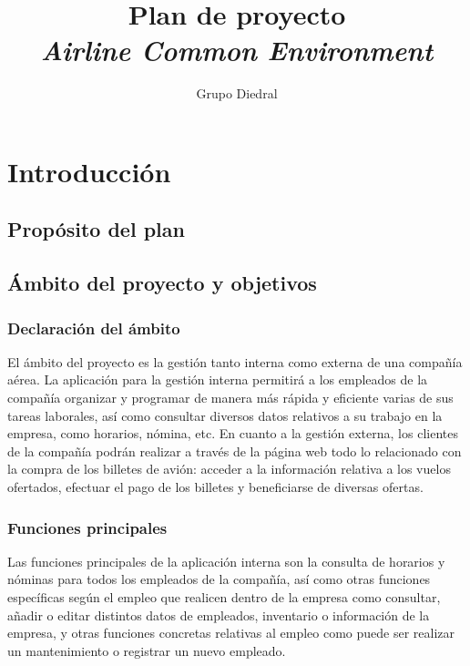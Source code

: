 \documentclass[11pt, a4paper, twoside]{report}
\title{Plan de proyecto\\\textsl{Airline Common Environment}}
\author{Grupo Diedral}
\begin{document}
	
	\tableofcontents
	\newpage

	\begin{scriptsize}
	\begin{tablacambios}
	\end{tablacambios}
	\end{scriptsize}
	\newpage

	\section{Introducción}
	\iniciarnumeraciondiedral
		\subsection{Propósito del plan}
		\subsection{Ámbito del proyecto y objetivos}
			\subsubsection{Declaración del ámbito}
			El ámbito del proyecto es la gestión tanto interna como externa de una compañía aérea. La aplicación para la gestión interna permitirá a los empleados de la compañía organizar y programar de manera más rápida y eficiente varias de sus tareas laborales, así como consultar diversos datos relativos a su trabajo en la empresa, como horarios, nómina, etc. En cuanto a la gestión externa, los clientes de la compañía podrán realizar a través de la página web todo lo relacionado con la compra de los billetes de avión: acceder a la información relativa a los vuelos ofertados, efectuar el pago de los billetes y beneficiarse de diversas ofertas.

			\subsubsection{Funciones principales}
			Las funciones principales de la aplicación interna son la consulta de horarios y nóminas para todos los empleados de la compañía, así como otras funciones específicas según el empleo que realicen dentro de la empresa como consultar, añadir o editar distintos datos de empleados, inventario o información de la empresa, y otras funciones concretas relativas al empleo como puede ser realizar un mantenimiento o registrar un nuevo empleado. \\
\end{document}
